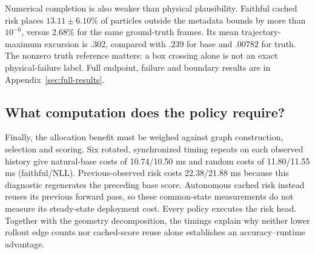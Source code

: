 Numerical completion is also weaker than physical plausibility. Faithful cached risk places $13.11\pm6.10\%$ of particles outside the metadata bounds by more than $10^{-6}$, versus $2.68\%$ for the same ground-truth frames. Its mean trajectory-maximum excursion is $.302$, compared with $.239$ for base and $.00782$ for truth. The nonzero truth reference matters: a box crossing alone is not an exact physical-failure label. Full endpoint, failure and boundary results are in Appendix~\ref{sec:full-results}.

\subsection{What computation does the policy require?}
Finally, the allocation benefit must be weighed against graph construction, selection and scoring. Six rotated, synchronized timing repeats on each observed history give natural-base costs of 10.74/10.50 ms and random costs of 11.80/11.55 ms (faithful/NLL). Previous-observed risk costs 22.38/21.88 ms because this diagnostic regenerates the preceding base score. Autonomous cached risk instead reuses its previous forward pass, so these common-state measurements do not measure its steady-state deployment cost. Every policy executes the risk head. Together with the geometry decomposition, the timings explain why neither lower rollout edge counts nor cached-score reuse alone establishes an accuracy--runtime advantage.

